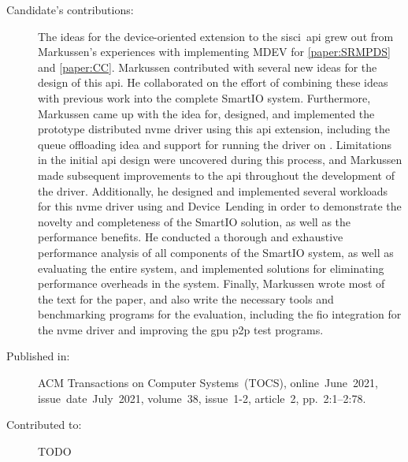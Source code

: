\begin{description}
	\item[Candidate's contributions:]
		The ideas for the device-oriented extension to the \acrshort{sisci}~\acrshort{api} grew out from Markussen's experiences with implementing MDEV for \cref{paper:SRMPDS} and \cref{paper:CC}.
		Markussen contributed with several new ideas for the design of this \acrshort{api}.
		He collaborated on the effort of combining these ideas with previous work into the complete SmartIO system. 
		Furthermore, Markussen came up with the idea for, designed, and implemented the prototype distributed \acrshort{nvme} driver using this \acrshort{api} extension, 
		including the queue offloading idea and support for running the driver on .
		Limitations in the initial \acrshort{api} design were uncovered during this process, and Markussen made subsequent improvements to the \acrshort{api} throughout the development of the driver.
		Additionally, he designed and implemented several workloads for this \acrshort{nvme} driver using  and Device~Lending
		in order to demonstrate the novelty and completeness of the SmartIO solution, as well as the performance benefits.
		He conducted a thorough and exhaustive performance analysis of all components of the SmartIO system,
		as well as evaluating the entire system, and implemented solutions for eliminating performance overheads in the system.
		Finally, Markussen wrote most of the text for the paper, and also write the necessary tools and benchmarking programs for the evaluation,
		including the \acrshort{fio} integration for the \acrshort{nvme} driver and improving the \acrshort{gpu} \acrshort{p2p} test programs.
		

	\item[Published in:]
		ACM Transactions on Computer Systems~(TOCS), 
		online~June~2021,
		issue~date~July~2021, 
		volume~38, issue~1-2, article~2, pp.~2:1--2:78.

	\item[Contributed to:]
		TODO

\end{description}
